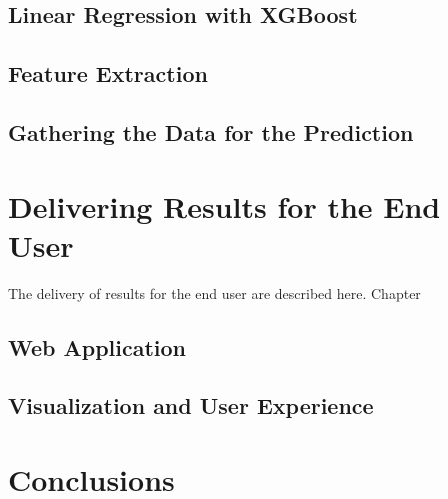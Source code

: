 \documentclass{article}
\begin{document}

\subsection{Linear Regression with XGBoost}
\label{subsection:xgboost}


\subsection{Feature Extraction}
\label{subsection:extraction}

\subsection{Gathering the Data for the Prediction}
\label{subsection:datafilling}


\section{Delivering Results for the End User}
\label{section:delivery}

The delivery of results for the end user are described here. Chapter 

\subsection{Web Application}
\label{subsection:server}

\subsection{Visualization and User Experience}
\label{subsection:ux}


\section{Conclusions}
\label{section:conclusions}

\end{document}
